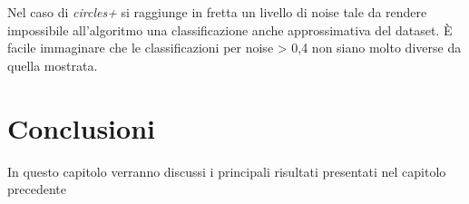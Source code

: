 \documentclass[12pt,a4paper]{report}
\begin{document}
Nel caso di \textit{circles+} si raggiunge in fretta un livello di noise tale da rendere impossibile all'algoritmo una classificazione anche approssimativa del dataset. 
È facile immaginare che le classificazioni per noise > 0,4 non siano molto diverse da quella mostrata.

\chapter{Conclusioni}

In questo capitolo verranno discussi i principali risultati presentati nel capitolo precedente

\listoffigures

\nocite{*}


\end{document}
